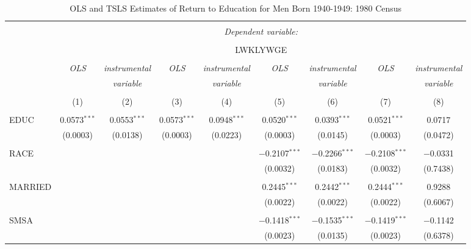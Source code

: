 
\begin{table}[!htbp] \centering 
  \caption{OLS and TSLS Estimates of Return to Education for Men Born 
    1940-1949: 1980 Census} 
  \label{} 
\begin{tabular}{@{\extracolsep{5pt}}lcccccccc} 
\\[-1.8ex]\hline 
\hline \\[-1.8ex] 
 & \multicolumn{8}{c}{\textit{Dependent variable:}} \\ 
\cline{2-9} 
\\[-1.8ex] & \multicolumn{8}{c}{LWKLYWGE} \\ 
\\[-1.8ex] & \textit{OLS} & \textit{instrumental} & \textit{OLS} & \textit{instrumental} & \textit{OLS} & \textit{instrumental} & \textit{OLS} & \textit{instrumental} \\ 
 & \textit{} & \textit{variable} & \textit{} & \textit{variable} & \textit{} & \textit{variable} & \textit{} & \textit{variable} \\ 
\\[-1.8ex] & (1) & (2) & (3) & (4) & (5) & (6) & (7) & (8)\\ 
\hline \\[-1.8ex] 
 EDUC & 0.0573$^{***}$ & 0.0553$^{***}$ & 0.0573$^{***}$ & 0.0948$^{***}$ & 0.0520$^{***}$ & 0.0393$^{***}$ & 0.0521$^{***}$ & 0.0717 \\ 
  & (0.0003) & (0.0138) & (0.0003) & (0.0223) & (0.0003) & (0.0145) & (0.0003) & (0.0472) \\ 
  & & & & & & & & \\ 
 RACE &  &  &  &  & $-$0.2107$^{***}$ & $-$0.2266$^{***}$ & $-$0.2108$^{***}$ & $-$0.0331 \\ 
  &  &  &  &  & (0.0032) & (0.0183) & (0.0032) & (0.7438) \\ 
  & & & & & & & & \\ 
 MARRIED &  &  &  &  & 0.2445$^{***}$ & 0.2442$^{***}$ & 0.2444$^{***}$ & 0.9288 \\ 
  &  &  &  &  & (0.0022) & (0.0022) & (0.0022) & (0.6067) \\ 
  & & & & & & & & \\ 
 SMSA &  &  &  &  & $-$0.1418$^{***}$ & $-$0.1535$^{***}$ & $-$0.1419$^{***}$ & $-$0.1142 \\ 
  &  &  &  &  & (0.0023) & (0.0135) & (0.0023) & (0.6378) \\ 

\end{tabular}
\end{table}
